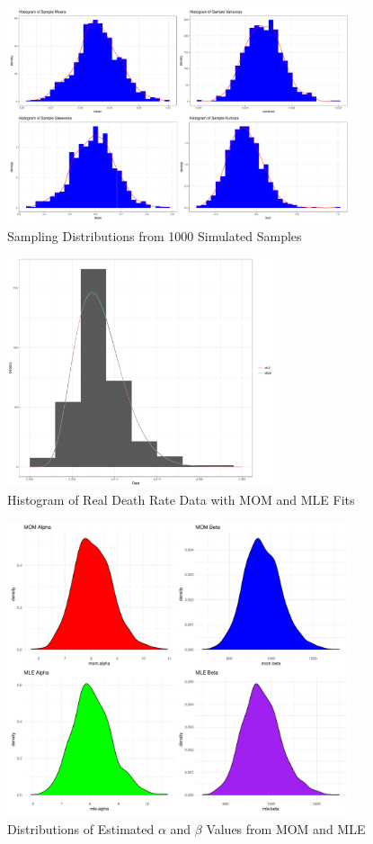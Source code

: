 \documentclass{article}\usepackage[]{graphicx}\usepackage[]{xcolor}
\begin{document}
\begin{figure}[h]
\centering
\includegraphics[width=0.9\textwidth]{sample_stats_histograms.pdf}
\caption{Sampling Distributions from 1000 Simulated Samples}
\end{figure}

\begin{figure}[h]
\centering
\includegraphics[width=0.7\textwidth]{MOM_MLE_histogram.pdf}
\caption{Histogram of Real Death Rate Data with MOM and MLE Fits}
\end{figure}

\begin{figure}[h]
\centering
\includegraphics[width=0.9\textwidth]{alpha_beta_densities.pdf}
\caption{Distributions of Estimated $\alpha$ and $\beta$ Values from MOM and MLE}
\end{figure}
\end{document}
